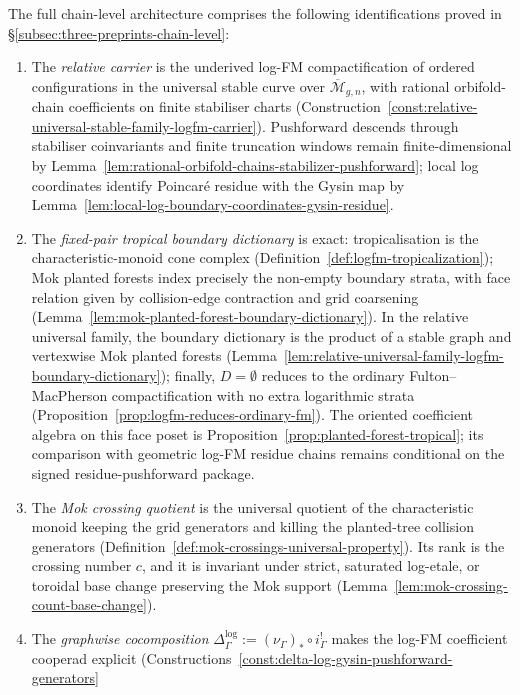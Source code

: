 \begin{summary}
The full chain-level architecture comprises the following
identifications proved in
\S\ref{subsec:three-preprints-chain-level}:
\begin{enumerate}[label=\textup{(\alph*)}]
\item The \emph{relative carrier} is the underived log-FM
 compactification of ordered configurations in the universal stable
 curve over $\overline{\mathcal M}_{g,n}$, with rational
 orbifold-chain coefficients on finite stabiliser charts
 (Construction~\ref{const:relative-universal-stable-family-logfm-carrier}).
 Pushforward descends through stabiliser coinvariants and finite
 truncation windows remain finite-dimensional by
 Lemma~\ref{lem:rational-orbifold-chains-stabilizer-pushforward}; local
 log coordinates identify Poincar\'e residue with the Gysin map by
 Lemma~\ref{lem:local-log-boundary-coordinates-gysin-residue}.
\item The \emph{fixed-pair tropical boundary dictionary} is exact:
 tropicalisation is the characteristic-monoid cone complex
 (Definition~\ref{def:logfm-tropicalization}); Mok planted forests
 index precisely the non-empty boundary strata, with face relation given
 by collision-edge contraction and grid coarsening
 (Lemma~\ref{lem:mok-planted-forest-boundary-dictionary}). In the
 relative universal family, the boundary dictionary is the product of a
 stable graph and vertexwise Mok planted forests
 (Lemma~\ref{lem:relative-universal-family-logfm-boundary-dictionary});
 finally,
 $D=\emptyset$ reduces to the ordinary Fulton--MacPherson
 compactification with no extra logarithmic strata
 (Proposition~\ref{prop:logfm-reduces-ordinary-fm}). The oriented
 coefficient algebra on this face poset is
 Proposition~\ref{prop:planted-forest-tropical}; its comparison with
 geometric log-FM residue chains remains conditional on the signed
 residue-pushforward package.
\item The \emph{Mok crossing quotient} is the universal quotient of the
 characteristic monoid keeping the grid generators and killing the
 planted-tree collision generators
 (Definition~\ref{def:mok-crossings-universal-property}). Its rank is
 the crossing number $c$, and it is invariant under strict, saturated
 log-etale, or toroidal base change preserving the Mok support
 (Lemma~\ref{lem:mok-crossing-count-base-change}).
\item The \emph{graphwise cocomposition}
 $\Delta^{\log}_\Gamma := (\nu_\Gamma)_*\circ i_\Gamma^!$
 makes the log-FM
 coefficient cooperad explicit
 (Constructions~\ref{const:delta-log-gysin-pushforward-generators}

\end{enumerate}
\end{summary}
